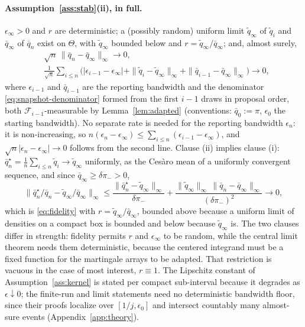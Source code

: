 \documentclass[10pt]{article}
\theoremstyle{plain}
\theoremstyle{definition}
\begin{document}
\paragraph{Assumption~\ref{ass:stab}(ii), in full.} $\epsilon_\infty>0$ and $r$ are deterministic; a (possibly random) uniform limit $\tilde q_\infty$ of $\tilde q_i$ and $\bar q_\infty$ of $\bar q_n$ exist on $\Theta$, with $\tilde q_\infty$ bounded below and $r=\tilde q_\infty/\bar q_\infty$; and, almost surely,
\begin{equation}
\begin{aligned}
&\sqrt n\,\|\bar q_n-\bar q_\infty\|_\infty\to0,\\
&\tfrac{1}{\sqrt n}\textstyle\sum_{i\le n}\bigl(|\epsilon_{i-1}-\epsilon_\infty|+\|\tilde q_i-\tilde q_\infty\|_\infty+\|\bar q_{i-1}-\bar q_\infty\|_\infty\bigr)\to0,
\end{aligned}
\label{eq:rate}
\end{equation}
where $\epsilon_{i-1}$ and $\bar q_{i-1}$ are the reporting bandwidth and the denominator \eqref{eq:snapshot-denominator} formed from the first $i-1$ draws in proposal order, both $\mathcal{F}_{i-1}$-measurable by Lemma~\ref{lem:adapted} (conventions: $\bar q_0:=\pi$, $\epsilon_0$ the starting bandwidth). No separate rate is needed for the reporting bandwidth $\epsilon_n$: it is non-increasing, so $n(\epsilon_n-\epsilon_\infty)\le\sum_{i\le n}(\epsilon_{i-1}-\epsilon_\infty)$, and $\sqrt n|\epsilon_n-\epsilon_\infty|\to0$ follows from the second line. Clause (ii) implies clause (i): $\bar q^\star_n=\tfrac1n\sum_{i\le n}\tilde q_i\to\tilde q_\infty$ uniformly, as the Ces\`aro mean of a uniformly convergent sequence, and since $\bar q_\infty\ge\delta\pi_->0$,
\[
\bigl\|\bar q^\star_n/\bar q_n-\tilde q_\infty/\bar q_\infty\bigr\|_\infty
\le\frac{\|\bar q^\star_n-\tilde q_\infty\|_\infty}{\delta\pi_-}
+\frac{\|\tilde q_\infty\|_\infty\,\|\bar q_n-\bar q_\infty\|_\infty}{(\delta\pi_-)^2}\longrightarrow0,
\]
which is \eqref{eq:fidelity} with $r=\tilde q_\infty/\bar q_\infty$, bounded above because a uniform limit of densities on a compact box is bounded and below because $\tilde q_\infty$ is. The two clauses differ in strength: fidelity permits $r$ and $\epsilon_\infty$ to be random, while the central limit theorem needs them deterministic, because the centered integrand must be a fixed function for the martingale arrays to be adapted. That restriction is vacuous in the case of most interest, $r\equiv1$. The Lipschitz constant of Assumption~\ref{ass:kernel} is stated per compact sub-interval because it degrades as $\epsilon\downarrow0$; the finite-run and limit statements need no deterministic bandwidth floor, since their proofs localize over $[1/j,\epsilon_0]$ and intersect countably many almost-sure events (Appendix~\ref{app:theory}).
\end{document}
